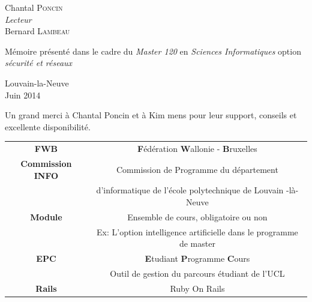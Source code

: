 \begin{titlepage}
\begin{center}
\begin{minipage}{0.4\textwidth}
\begin{flushleft}
Chantal \textsc{Poncin}\\
\emph{Lecteur}\\Bernard \textsc{Lambeau}\\
\end{flushleft}
\end{minipage}
\begin{minipage}{0.4\textwidth}
\begin{flushright} \large
Mémoire présenté dans le cadre du \emph{Master 120} en \emph{Sciences Informatiques} option \emph{sécurité et réseaux}
\end{flushright}
\end{minipage}
\vfill
Louvain-la-Neuve\\
{\large Juin 2014}
\end{center}
\end{titlepage}
\newpage
\vspace*{\fill}
\begin{center}
\begin{minipage}{0.4\textwidth}
\begin{flushright} \large
Un grand merci à Chantal Poncin et à Kim mens pour leur support, conseils et excellente disponibilité.
\end{flushright}
\end{minipage}
\end{center}
\vspace*{\fill}

\tableofcontents
%

\clearpage
{} 

\begin{longtable}{c c}

\textbf{FWB} & \textbf{F}édération \textbf{W}allonie - \textbf{B}ruxelles\\
\textbf{Commission INFO} & Commission de Programme du département\\ 
&d'informatique de l'école polytechnique de Louvain -là-Neuve\\
\textbf{Module} & Ensemble de cours, obligatoire ou non\\
& Ex: L'option intelligence artificielle dans le programme de master\\
\textbf{EPC} & \textbf{E}tudiant \textbf{P}rogramme \textbf{C}ours\\
&Outil de gestion du parcours étudiant de l’UCL\\
\textbf{Rails} & Ruby On Rails\\
\end{longtable}

